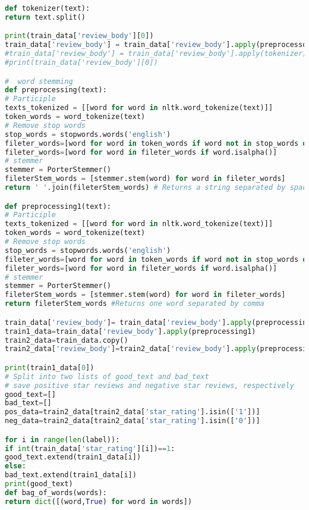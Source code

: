 \documentclass{mcmthesis}
\begin{document}
\begin{appendices}
\begin{lstlisting}[language=python]
def tokenizer(text):
return text.split()

print(train_data['review_body'][0])
train_data['review_body'] = train_data['review_body'].apply(preprocessor)
#train_data['review_body'] = train_data['review_body'].apply(tokenizer)
#print(train_data['review_body'][0])

#  word stemming
def preprocessing(text):
# Participle
texts_tokenized = [[word for word in nltk.word_tokenize(text)]]
token_words = word_tokenize(text)
# Remove stop words
stop_words = stopwords.words('english')
fileter_words=[word for word in token_words if word not in stop_words or word == 'not']
fileter_words=[word for word in fileter_words if word.isalpha()]
# stemmer
stemmer = PorterStemmer()
fileterStem_words = [stemmer.stem(word) for word in fileter_words]
return ' '.join(fileterStem_words) # Returns a string separated by spaces

def preprocessing1(text):
# Participle
texts_tokenized = [[word for word in nltk.word_tokenize(text)]]
token_words = word_tokenize(text)
# Remove stop words
stop_words = stopwords.words('english')
fileter_words=[word for word in token_words if word not in stop_words or word == 'not']
fileter_words=[word for word in fileter_words if word.isalpha()]
# stemmer
stemmer = PorterStemmer()
fileterStem_words = [stemmer.stem(word) for word in fileter_words]
return fileterStem_words #Returns one word separated by comma

train_data['review_body']= train_data['review_body'].apply(preprocessing)
train1_data=train_data['review_body'].apply(preprocessing1)
train2_data=train_data.copy()
train2_data['review_body']=train2_data['review_body'].apply(preprocessing1)

print(train1_data[0])
# Split into two lists of good_text and bad_text
# save positive star reviews and negative star reviews, respectively
good_text=[]
bad_text=[]
pos_data=train2_data[train2_data['star_rating'].isin(['1'])]
neg_data=train2_data[train2_data['star_rating'].isin(['0'])]

for i in range(len(label)):
if int(train_data['star_rating'][i])==1:
good_text.extend(train1_data[i])
else:
bad_text.extend(train1_data[i])
print(good_text)
def bag_of_words(words):
return dict([(word,True) for word in words])


\end{lstlisting}
\end{appendices}
\end{document}
